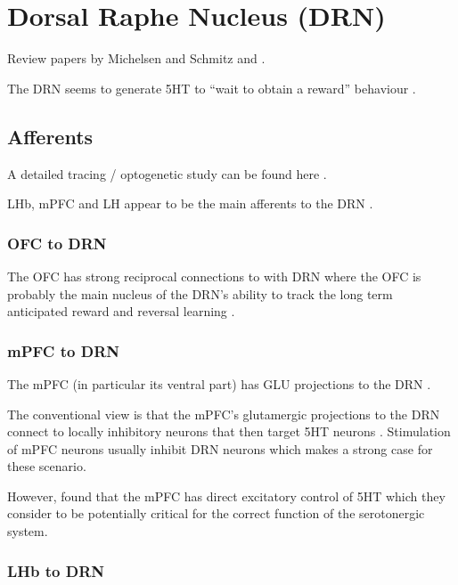\documentclass[12pt,a4paper]{article}
\let\oldsection\section
\renewcommand\section{\clearpage\oldsection}
\begin{document}
\section{Dorsal Raphe Nucleus (DRN)}

Review papers by Michelsen and Schmitz \citep{Michelsen2007} and \citep{Nakamura2013}.

The DRN seems to generate 5HT to “wait to obtain a reward” behaviour  \citep{Nakamura2013}.

\subsection{Afferents}

A detailed tracing / optogenetic study can be found here  \citep{PollakDorocic2014}.

LHb, mPFC and LH appear to be the main afferents to the DRN \citep{Vertes2010} \citep{Sparta2014} \citep{Lee2003}.

\subsubsection{OFC to DRN}

The OFC has strong reciprocal connections to with DRN \citep{Zhou2015} where the OFC is probably the main nucleus of the DRN's ability to track the long term anticipated reward and reversal learning \citep{Roberts2011}.

\subsubsection{mPFC to DRN}

The mPFC (in particular its ventral part) has GLU projections to the DRN \citep{Goncalves2009} \citep{Lee2003}.

The conventional view is that the mPFC’s glutamergic projections to the DRN connect to locally inhibitory neurons that then target 5HT neurons \citep{Celada2001}. Stimulation of mPFC neurons usually inhibit DRN neurons which makes a strong case for these scenario.

However, \citep{PollakDorocic2014} found that the mPFC has direct excitatory control of 5HT which they consider to be potentially critical for the correct function of the serotonergic system. 

\subsubsection{LHb to DRN}
\end{document}
